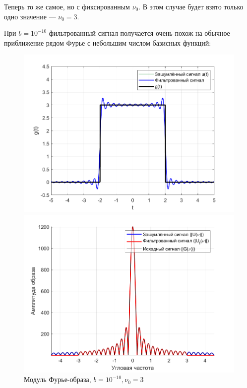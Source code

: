 \documentclass[a4paper]{article}
\begin{document}
Теперь то же самое, но с фиксированным $\nu_0$. В этом случае будет взято только одно значение --- $\nu_0 = 3$.\

При $b = 10^{-10}$ фильтрованный сигнал получается очень похож на обычное приближение рядом Фурье с небольшим числом базисных функций:

\begin{figure}[H]
    \begin{minipage}{0.5\textwidth}
        \centering
        \includegraphics[width=\textwidth]{part1/1e-10_3.png}
        \caption{$b=10^{-10}, \nu_0 = 3$}
    \end{minipage}    
    \begin{minipage}{0.5\textwidth}
        \centering
        \includegraphics[width=\textwidth]{part1/1e-10_3_Fourier.png}
        \caption{Модуль Фурье-образа, $b=10^{-10}, \nu_0 = 3$}
    \end{minipage}
\end{figure}\
\end{document}
